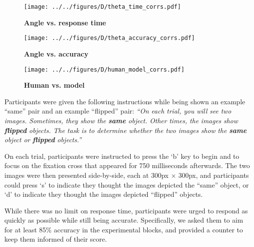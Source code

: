 \documentclass[10pt,letterpaper]{article}
\newcommand{\Oc}[0]{Oracle}
\newcommand{\Th}[0]{Threshold}
\begin{document}
\begin{figure*}[t]
  \centering
  \begin{subfigure}[b]{0.32\textwidth}
    \texttt{[image: ../../figures/D/theta\_time\_corrs.pdf]}
    \caption{\textbf{Angle vs. response time}}
    \label{fig:theta-time-corrs}
  \end{subfigure}%
  \begin{subfigure}[b]{0.32\textwidth}
    \texttt{[image: ../../figures/D/theta\_accuracy\_corrs.pdf]}
    \caption{\textbf{Angle vs. accuracy}}
    \label{fig:theta-accuracy-corrs}
  \end{subfigure}%
  \begin{subfigure}[b]{0.32\textwidth}
    \texttt{[image: ../../figures/D/human\_model\_corrs.pdf]}
    \caption{\textbf{Human vs. model}}
    \label{fig:human-model-corrs}
  \end{subfigure}
  \vspace{10pt}
  \caption{\textbf{Correlations.} (a) Spearman correlations between
    the minimum angle of rotation and response time. (b) Spearman
    correlations between the minimum angle of rotation and
    accuracy. The \Oc{} and \Th{} models had 100\% accuracy;
    therefore, their correlations are undefined. (c) Pearson
    correlations between human and model (except the first set of
    bars, which is human vs. human), both for response time and
    accuracy. All error bars are 95\% confidence intervals.}
\end{figure*}

Participants were given the following instructions while being shown
an example ``same'' pair and an example ``flipped'' pair: \textit{``On
  each trial, you will see two images. Sometimes, they show the
  \textbf{same} object. Other times, the images show \textbf{flipped}
  objects. The task is to determine whether the two images show the
  \textbf{same} object or \textbf{flipped} objects.''}

On each trial, participants were instructed to press the `b' key to
begin and to focus on the fixation cross that appeared for 750
milliseconds afterwards. The two images were then presented
side-by-side, each at 300px $\times$ 300px, and participants could
press `s' to indicate they thought the images depicted the ``same''
object, or `d' to indicate they thought the images depicted
``flipped'' objects.

While there was no limit on response time, participants were urged to
respond as quickly as possible while still being
accurate. Specifically, we asked them to aim for at least 85\%
accuracy in the experimental blocks, and provided a counter to keep
them informed of their score.
\end{document}
